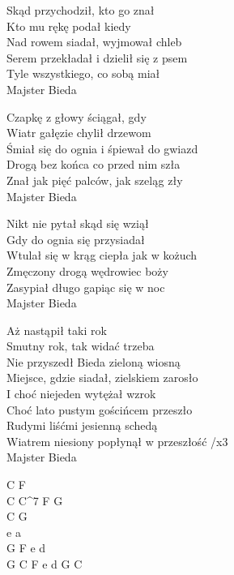 
\begin{text}
    Skąd przychodził, kto go znał\\
    Kto mu rękę podał kiedy\\
    Nad rowem siadał, wyjmował chleb\\
    Serem przekładał i dzielił się z psem\\
    Tyle wszystkiego, co sobą miał\\
    Majster Bieda

    Czapkę z głowy ściągał, gdy\\
    Wiatr gałęzie chylił drzewom\\
    Śmiał się do ognia i śpiewał do gwiazd\\
    Drogą bez końca co przed nim szła\\
    Znał jak pięć palców, jak szeląg zły\\
    Majster Bieda

    Nikt nie pytał skąd się wziął\\
    Gdy do ognia się przysiadał\\
    Wtulał się w krąg ciepła jak w kożuch\\
    Zmęczony drogą wędrowiec boży\\
    Zasypiał długo gapiąc się w noc\\
    Majster Bieda

    Aż nastąpił taki rok\\
    Smutny rok, tak widać trzeba\\
    Nie przyszedł Bieda zieloną wiosną\\
    Miejsce, gdzie siadał, zielskiem zarosło\\
    I choć niejeden wytężał wzrok\\
    Choć lato pustym gościńcem przeszło\\
    Rudymi liśćmi jesienną schedą\\
    Wiatrem niesiony popłynął w przeszłość /x3\\
    Majster Bieda
\end{text}
\begin{chord}
    C F\\
    C C^7 F G\\
    C G\\
    e a\\
    G F e d\\
    G C F e d G C
\end{chord}